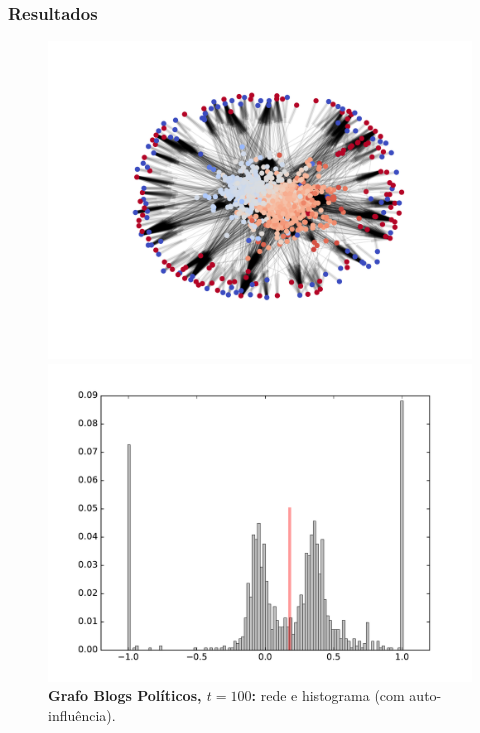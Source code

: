 \begin{frame}
  \frametitle{Resultados}

  \begin{figure}
  \centering
  \begin{minipage}{5.5cm}
    \includegraphics[width=\textwidth]{./figures/99SIN100}
  \end{minipage}
  \begin{minipage}{5.5cm}
    \includegraphics[width=\textwidth]{./figures/99SIH100}
  \end{minipage}
  \vspace{5mm}
  \caption*{\textbf{Grafo Blogs Políticos, $t = 100$:} rede e histograma
    (com auto-influência).}
  \end{figure}
\end{frame}


